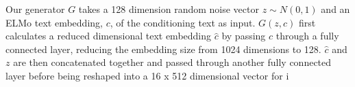 Our generator $G$ takes a 128 dimension random noise vector $z \sim N(0, 1)$ and an ELMo text embedding, $c$, of the conditioning text as input. $G(z, c)$ first calculates a reduced dimensional text embedding $\hat{c}$ by passing $c$ through a fully connected layer, reducing the embedding size from 1024 dimensions to 128. $\hat{c}$ and $z$ are then concatenated together and passed through another fully connected layer before being reshaped into a 16 x 512 dimensional vector for i 